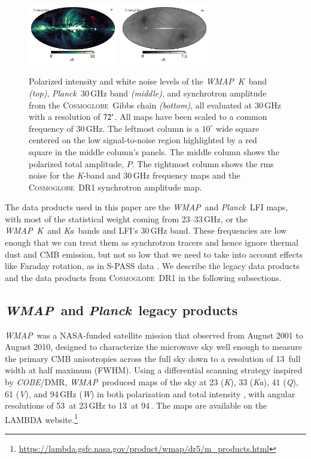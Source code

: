 \documentclass[twocolumn]{../../common/aa}
\def\WMAP{\emph{WMAP}}
\def\COBE{\emph{COBE}}
\def\Planck{\emph{Planck}}
\newcommand{\cosmoglobe}{\textsc{Cosmoglobe}}
\newcommand{\K}[0]{\textit K}
\newcommand{\Ka}[0]{\textit{Ka}}
\newcommand{\Q}[0]{\textit Q}
\newcommand{\V}[0]{\textit V}
\newcommand{\W}[0]{\textit W}
\begin{document}
\begin{figure}
	\includegraphics[width=0.35\textwidth]{figures/polint_CG.pdf}
	\includegraphics[width=0.35\textwidth]{figures/polint_CG_sigma.pdf}
	\caption{
		Polarized intensity and white noise levels of the \WMAP\ \K\ band \textit{(top)}, \Planck\ 30\,GHz band \textit{(middle)}, and synchrotron amplitude from the \cosmoglobe\ Gibbs chain \textit{(bottom)}, all evaluated at 30\,GHz with a resolution of $72\arcm$. 
		All maps have been scaled to a common frequency of 30\,GHz.
		The leftmost column is a $10^\circ$ wide square centered on the low signal-to-noise region highlighted by a red square in the middle column's panels. The middle column shows the polarized total amplitude, $P$. The rightmost column shows the rms noise for the \K-band and 30\,GHz frequency maps and the \cosmoglobe\ DR1 synchrotron amplitude map.
		}
       \label{fig:synch_polint}
\end{figure}


The data products used in this paper are the \WMAP\ and \Planck\ LFI maps, with most of the statistical weight coming from 23--33\,GHz, or the \WMAP\ \K\ and \Ka\ bands and LFI's 30\,GHz band. These frequencies are low enough that we can treat them as synchrotron tracers and hence ignore thermal dust and CMB emission, but not so low that we need to take into account effects like Faraday rotation, as in S-PASS data \citep{krachmalnicoff2018,fuskeland:2019}. We describe the legacy data products and the data products from \cosmoglobe\ DR1 in the following subsections.


\subsection{\WMAP\ and \Planck\ legacy products}
\label{sec:wmap_data}

\WMAP\ was a NASA-funded satellite mission that observed from August 2001 to August 2010, designed to characterize the microwave sky well enough to measure the primary CMB anisotropies across the full sky down to a resolution of 13\arcm\ full width at half maximum (FWHM). Using a differential scanning strategy inspired by \COBE/DMR,
\WMAP\ produced maps of the sky at 23 (\K), 33 (\Ka), 41 (\Q), 61 (\V), and 94\,GHz (\W) in both polarization and total intensity \citep{bennett2012}, with angular resolutions of 53\arcm\ at 23\,GHz to 13\arcm\ at 94\,\GHz. 
The maps are available on the LAMBDA website.\footnote{\url{https://lambda.gsfc.nasa.gov/product/wmap/dr5/m_products.html}} 
\end{document}
